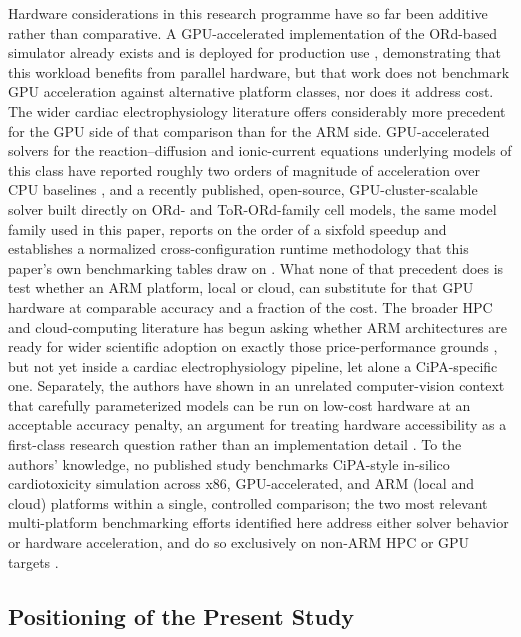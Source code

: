\documentclass[journal]{IEEEtran}
\begin{document}
Hardware considerations in this research programme have so far been additive rather than comparative. A GPU-accelerated implementation of the ORd-based simulator already exists and is deployed for production use \cite{aroli2024}, demonstrating that this workload benefits from parallel hardware, but that work does not benchmark GPU acceleration against alternative platform classes, nor does it address cost. The wider cardiac electrophysiology literature offers considerably more precedent for the GPU side of that comparison than for the ARM side. GPU-accelerated solvers for the reaction--diffusion and ionic-current equations underlying models of this class have reported roughly two orders of magnitude of acceleration over CPU baselines \cite{bartocci2015}, and a recently published, open-source, GPU-cluster-scalable solver built directly on ORd- and ToR-ORd-family cell models, the same model family used in this paper, reports on the order of a sixfold speedup and establishes a normalized cross-configuration runtime methodology that this paper's own benchmarking tables draw on \cite{sachetto2025,marinsdelima2025}. What none of that precedent does is test whether an ARM platform, local or cloud, can substitute for that GPU hardware at comparable accuracy and a fraction of the cost. The broader HPC and cloud-computing literature has begun asking whether ARM architectures are ready for wider scientific adoption on exactly those price-performance grounds \cite{armhpc2023,awsgraviton}, but not yet inside a cardiac electrophysiology pipeline, let alone a CiPA-specific one. Separately, the authors have shown in an unrelated computer-vision context that carefully parameterized models can be run on low-cost hardware at an acceptable accuracy penalty, an argument for treating hardware accessibility as a first-class research question rather than an implementation detail \cite{pramawijaya2022}. To the authors' knowledge, no published study benchmarks CiPA-style in-silico cardiotoxicity simulation across x86, GPU-accelerated, and ARM (local and cloud) platforms within a single, controlled comparison; the two most relevant multi-platform benchmarking efforts identified here address either solver behavior or hardware acceleration, and do so exclusively on non-ARM HPC or GPU targets \cite{sachetto2025,marinsdelima2025}.

\subsection{Positioning of the Present Study}
\end{document}
